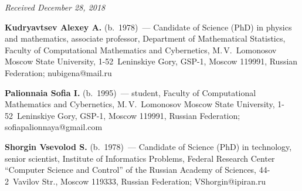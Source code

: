 \vspace*{-6pt}

\hfill{\small\textit{Received December 28, 2018}}



\Contr


\noindent
\textbf{Kudryavtsev Alexey A.} (b.\ 1978)~--- 
Candidate of Science (PhD) in physics and mathematics, 
associate professor, Department of Mathematical Statistics, 
Faculty of Computational Mathematics and Cybernetics, M.\,V.~Lomonosov Moscow 
State University, 1-52~Leninskiye Gory, GSP-1, Moscow 119991, Russian Federation; 
\mbox{nubigena@mail.ru}

\vspace*{3pt}

\noindent
\textbf{Palionnaia Sofia I.} (b.\ 1995)~--- 
student, Faculty of Computational Mathematics and Cybernetics,
 M.\,V.~Lomonosov Moscow State University, 1-52~Leninskiye Gory, GSP-1, Moscow 119991, 
 Russian Federation; \mbox{sofiapalionnaya@gmail.com}
 
 \vspace*{3pt}

\noindent
\textbf{Shorgin Vsevolod S.} (b.\ 1978)~--- Candidate of Science (PhD) in technology, 
senior scientist, Institute of Informatics Problems, Federal Research Center 
``Computer Science and Control'' of the Russian Academy of Sciences, 
44-2~Vavilov Str., Moscow 119333, Russian Federation; \mbox{VShorgin@ipiran.ru}


\label{end\stat}

\renewcommand{\bibname}{\protect\rm Литература}       